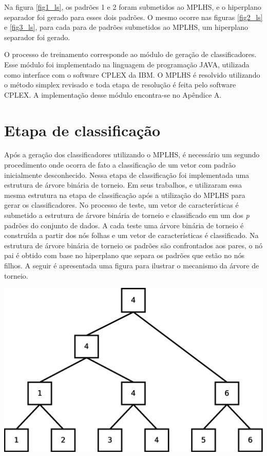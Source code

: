 Na figura \ref{fig1_ls}, os padrões 1 e 2 foram submetidos ao MPLHS, e o hiperplano separador foi gerado para esses dois padrões. O mesmo ocorre nas figuras \ref{fig2_ls} e \ref{fig3_ls}, para cada para de padrões submetidos ao MPLHS, um hiperplano separador foi gerado.

O processo de treinamento corresponde ao módulo de geração de classificadores. Esse módulo foi implementado na linguagem de programação JAVA, utilizada como interface com o software CPLEX da IBM. O MPLHS é resolvido utilizando o método simplex revisado e toda etapa de resolução é feita pelo software CPLEX. A implementação desse módulo encontra-se no Apêndice A.

\section{Etapa de classificação} 
Após a geração dos classificadores utilizando o MPLHS, é necessário um segundo procedimento onde ocorra de fato a classificação de um vetor com padrão inicialmente desconhecido. Nessa etapa de classificação foi implementada uma estrutura de árvore binária de torneio. Em seus trabalhos,  e  utilizaram essa mesma estrutura na etapa de classificação após a utilização do MPLHS para gerar os classificadores.
No processo de teste, um vetor de características é submetido a estrutura de árvore binária de torneio e classificado em um dos \textit{p} padrões do conjunto de dados.
A cada teste uma árvore binária de torneio é construída a partir dos nós folhas e um vetor de características é classificado. Na estrutura de árvore binária de torneio os padrões são confrontados aos pares, o nó pai é obtido com base no hiperplano que separa os padrões que estão no nós filhos.%
A seguir é apresentada uma figura para ilustrar o mecanismo da árvore de torneio.

\begin{center}
	\includegraphics[scale=0.4]{graficos/ArvTorneio1}
	\label{img:ArvTorneio1}
\end{center}

